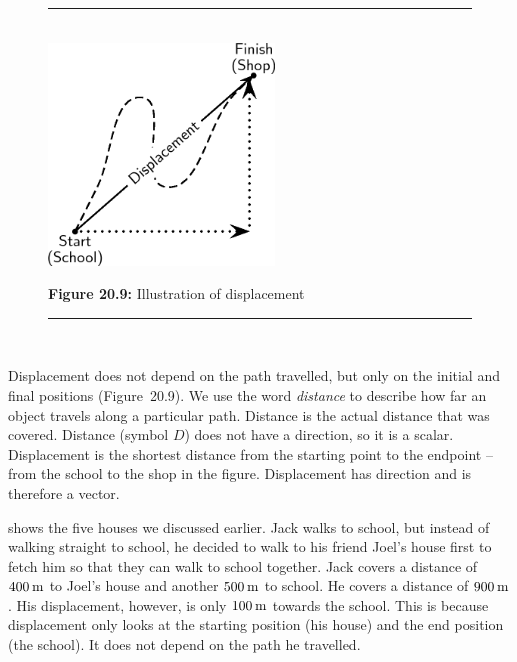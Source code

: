 	\begin{figure}[H] %
    \begin{center}
    \rule[.1in]{\figurerulewidth}{.005in} \\
        \label{m38788*uid17!!!underscore!!!media}\label{m38788*uid17!!!underscore!!!printimage}\includegraphics[width=6cm]{col11305.imgs/m38788_PG10C2_008.png} %
      \vspace{2pt}
    \vspace{\rubberspace}\par \begin{cnxcaption}
	  \small \textbf{Figure 20.9: }Illustration of displacement
	\end{cnxcaption}
    \vspace{.1in}
    \rule[.1in]{\figurerulewidth}{.005in} \\
    \end{center}
 \end{figure}       
      \label{m38788*id63218}Displacement does not depend on the path travelled, but only on the initial and final positions (Figure~20.9). We use the word \textsl{distance} to describe how far an object travels along a particular path. Distance is the actual distance that was covered. Distance (symbol $D$) does not have a direction, so it is a scalar. Displacement is the shortest distance from the starting point to the endpoint -- from the school to the shop in the figure. Displacement has direction and is therefore a vector.\par 
      \label{m38788*id62109} shows the five houses we discussed earlier. Jack walks to school, but instead of walking straight to school, he decided to walk to his friend Joel's house first to fetch him so that they can walk to school together. Jack covers a distance of $400\phantom{\rule{2pt}{0ex}}\mathrm{m}$ to Joel's house and another $500\phantom{\rule{2pt}{0ex}}\mathrm{m}$ to school. He covers a distance of $900\phantom{\rule{2pt}{0ex}}\mathrm{m}$. His displacement, however, is only $100\phantom{\rule{2pt}{0ex}}\mathrm{m}$ towards the school. This is because displacement only looks at the starting position (his house) and the end position (the school). It does not depend on the path he travelled.\par 
